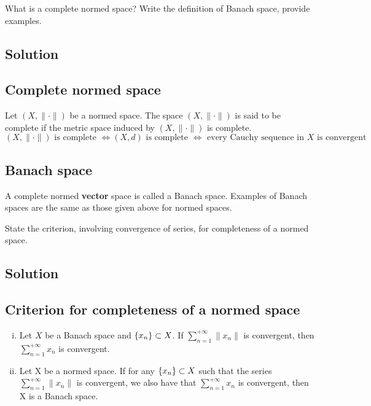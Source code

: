 
\question
What is a complete normed space? Write the definition of Banach space, provide examples.

\subsection*{Solution}

\subsection{Complete normed space}
Let $(X, \| \cdot \|)$ be a normed space. The space $(X, \| \cdot \|)$ is said to be complete if the metric space induced by $(X, \| \cdot \|)$ is complete.
\[ (X, \|\cdot\|) \text{ is complete } \iff (X, d) \text{ is complete } \iff \text{ every Cauchy sequence in } X \text{ is convergent} \]

\subsection{Banach space}
A complete normed \textbf{vector} space is called a Banach space. Examples of Banach spaces are the same as those given above for normed spaces.


\question
State the criterion, involving convergence of series, for completeness of a normed space.

\subsection*{Solution}

\subsection{Criterion for completeness of a normed space}
\begin{enumerate}[i)]
    \item Let $X$ be a Banach space and $\{ x_n \} \subset X$. If $\sum^{+\infty}_{n=1} \|x_n\|$ is convergent, then $\sum^{+\infty}_{n=1} x_n$ is convergent.
    \item Let X be a normed space. If for any $\{ x_n \} \subset X$ such that the series $\sum^{+\infty}_{n=1} \| x_n \|$ is convergent, we also have that $\sum_{n=1}^{+\infty} x_n$ is convergent, then X is a Banach space.
\end{enumerate}

